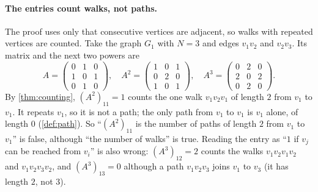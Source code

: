 \paragraph{The entries count walks, not paths.} The proof uses only that consecutive vertices are adjacent, so walks with repeated vertices are counted. Take the graph $G_1$ with $N=3$ and edges $v_1v_2$ and $v_2v_3$. Its matrix and the next two powers are
\[
A=\begin{pmatrix}0&1&0\\1&0&1\\0&1&0\end{pmatrix},\quad
A^2=\begin{pmatrix}1&0&1\\0&2&0\\1&0&1\end{pmatrix},\quad
A^3=\begin{pmatrix}0&2&0\\2&0&2\\0&2&0\end{pmatrix}.
\]
By \cref{thm:counting}, $(A^2)_{11}=1$ counts the one walk $v_1v_2v_1$ of length $2$ from $v_1$ to $v_1$. It repeats $v_1$, so it is not a path; the only path from $v_1$ to $v_1$ is $v_1$ alone, of length $0$ (\cref{def:path}). So ``$(A^2)_{11}$ is the number of paths of length $2$ from $v_1$ to $v_1$'' is false, although ``the number of walks'' is true. Reading the entry as ``$1$ if $v_j$ can be reached from $v_i$'' is also wrong: $(A^3)_{12}=2$ counts the walks $v_1v_2v_1v_2$ and $v_1v_2v_3v_2$, and $(A^3)_{13}=0$ although a path $v_1v_2v_3$ joins $v_1$ to $v_3$ (it has length $2$, not $3$).
